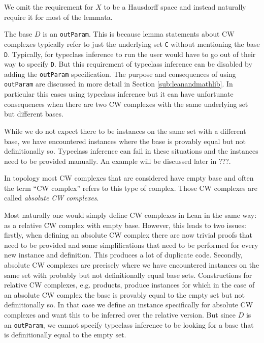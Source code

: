 We omit the requirement for $X$ to be a Hausdorff space and instead naturally require it for most of the lemmata. 

The base $D$ is an \lstinline|outParam|. 
This is because lemma statements about CW complexes typically refer to just the underlying set \lstinline|C| without mentioning the base \lstinline|D|. 
Typically, for typeclass inference to run the user would have to go out of their way to specify \lstinline|D|. 
But this requirement of typeclass inference can be disabled by adding the \lstinline|outParam| specification.
The purpose and consequences of using \lstinline|outParam| are discussed in more detail in Section \ref{sub:leanandmathlib}.
In particular this eases using typeclass inference but it can have unfortunate consequences when there are two CW complexes with the same underlying set but different bases.

While we do not expect there to be instances on the same set with a different base, we have encountered instances where the base is provably equal but not definitionally so. 
Typeclass inference can fail in these situations and the instances need to be provided manually. 
An example will be discussed later in ???. 

In topology most CW complexes that are considered have empty base and often the term ``CW complex'' refers to this type of complex. 
Those CW complexes are called \emph{absolute CW complexes}. 

Most naturally one would simply define CW complexes in Lean in the same way: as a relative CW complex with empty base.
However, this leads to two issues: 
firstly, when defining an absolute CW complex there are now trivial proofs that need to be provided and some simplifications that need to be performed for every new instance and definition. 
This produces a lot of duplicate code. 
Secondly, absolute CW complexes are precisely where we have encountered instances on the same set with probably but not definitionally equal base sets. 
Constructions for relative CW complexes, e.g. products, produce instances for which in the case of an absolute CW complex the base is provably equal to the empty set but not definitionally so. 
In that case we define an instance specifically for absolute CW complexes and want this to be inferred over the relative version. 
But since $D$ is an \lstinline|outParam|, we cannot specify typeclass inference to be looking for a base that is definitionally equal to the empty set. 

